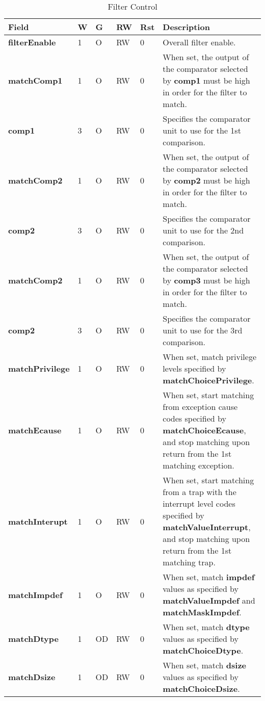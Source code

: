 \begin{table}[htp]
  \centering
  \caption{Filter Control}
  \label{tab:ctl-filter}
  \begin{tabulary}{\textwidth}{|l|l|l|l|l|p{80mm}|}
    \hline
    {\bf Field} & {\bf W} & {\bf G} & {\bf RW} & {\bf Rst} & {\bf Description} \\
    \hline
    \textbf{filterEnable} & 1 & O & RW & 0 & Overall filter enable.\\
    \hline
    \textbf{matchComp1} & 1 & O & RW & 0 & When set, the output of the comparator selected by \textbf{comp1} must be high in order for the filter to match.\\
    \hline
    \textbf{comp1} & 3 & O & RW & 0 & Specifies the comparator unit to use for the 1st comparison.\\
    \hline
    \textbf{matchComp2} & 1 & O & RW & 0 & When set, the output of the comparator selected by \textbf{comp2} must be high in order for the filter to match.\\
    \hline
    \textbf{comp2} & 3 & O & RW & 0 & Specifies the comparator unit to use for the 2nd comparison.\\
    \hline
    \textbf{matchComp2} & 1 & O & RW & 0 & When set, the output of the comparator selected by \textbf{comp3} must be high in order for the filter to match.\\
    \hline
    \textbf{comp2} & 3 & O & RW & 0 & Specifies the comparator unit to use for the 3rd comparison.\\
    \hline
    \textbf{matchPrivilege} & 1 & O & RW & 0 & When set, match privilege levels specified by \textbf{matchChoicePrivilege}.\\
    \hline
    \textbf{matchEcause} & 1 & O & RW & 0 & When set, start matching from exception cause codes specified by \textbf{matchChoiceEcause}, 
      and stop matching upon return from the 1st matching exception.\\
    \textbf{matchInterupt} & 1 & O & RW & 0 & When set, start matching from a trap with the interrupt level codes specified by \textbf{matchValueInterrupt}, 
      and stop matching upon return from the 1st matching trap.\\
    \hline
    \textbf{matchImpdef} & 1 & O & RW & 0 & When set, match \textbf{impdef} values as specified by \textbf{matchValueImpdef} and \textbf{matchMaskImpdef}.\\
    \hline
    \textbf{matchDtype} & 1 & OD & RW & 0 & When set, match \textbf{dtype} values as specified by \textbf{matchChoiceDtype}.\\
    \hline
    \textbf{matchDsize} & 1 & OD & RW & 0 & When set, match \textbf{dsize} values as specified by \textbf{matchChoiceDsize}.\\
    \hline
  \end{tabulary}
\end{table}


